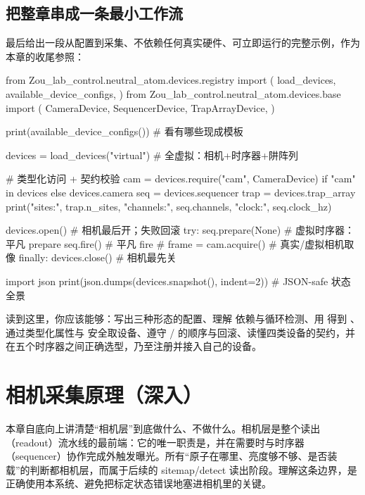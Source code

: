\documentclass[11pt,oneside,openany]{book}
\begin{document}
\section{把整章串成一条最小工作流}

最后给出一段从配置到采集、不依赖任何真实硬件、可立即运行的完整示例，作为本章的收尾参照：

\begin{codeblock}[Python]
from Zou_lab_control.neutral_atom.devices.registry import (
    load_devices, available_device_configs,
)
from Zou_lab_control.neutral_atom.devices.base import (
    CameraDevice, SequencerDevice, TrapArrayDevice,
)

print(available_device_configs())      # 看有哪些现成模板

devices = load_devices("virtual")      # 全虚拟：相机+时序器+阱阵列

# 类型化访问 + 契约校验
cam  = devices.require("cam", CameraDevice) if "cam" in devices else devices.camera
seq  = devices.sequencer
trap = devices.trap_array
print("sites:", trap.n_sites, "channels:", seq.channels, "clock:", seq.clock_hz)

devices.open()                          # 相机最后开；失败回滚
try:
    seq.prepare(None)                   # 虚拟时序器：平凡 prepare
    seq.fire()                          # 平凡 fire
    # frame = cam.acquire()            # 真实/虚拟相机取像
finally:
    devices.close()                     # 相机最先关

import json
print(json.dumps(devices.snapshot(), indent=2))   # JSON-safe 状态全景
\end{codeblock}

读到这里，你应该能够：写出三种形态的配置、理解  依赖与循环检测、用  得到 、通过类型化属性与  安全取设备、遵守 / 的顺序与回滚、读懂四类设备的契约，并在五个时序器之间正确选型，乃至注册并接入自己的设备。

\chapter{相机采集原理（深入）}

本章自底向上讲清楚“相机层”到底做什么、不做什么。相机层是整个读出（readout）流水线的最前端：它的唯一职责是，并在需要时与时序器（sequencer）协作完成外触发曝光。所有“原子在哪里、亮度够不够、是否装载”的判断都相机层，而属于后续的 sitemap/detect 读出阶段。理解这条边界，是正确使用本系统、避免把标定状态错误地塞进相机里的关键。
\end{document}
